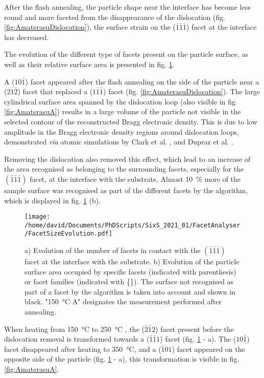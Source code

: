 After the flash annealing, the particle shape near the interface has become less round and more faceted from the disappearance of the dislocation (fig. \ref{fig:AmaterasuDislocation}), the surface strain on the ($\bar{1}\bar{1}\bar{1}$) facet at the interface has decreased.

The evolution of the different type of facets present on the particle surface, as well as their relative surface area is presented in fig. \ref{fig:AmaterasuFacetsEvolution}.

A ($10\bar{1}$) facet appeared after the flash annealing on the side of the particle near a (2$\bar{1}\bar{2}$) facet that replaced a ($1\bar{1}\bar{1}$) facet (fig. \ref{fig:AmaterasuDislocation}).
The large cylindrical surface area spanned by the dislocation loop (also visible in fig. \ref{fig:AmaterasuA}) results in a large volume of the particle not visible in the selected contour of the reconstructed Bragg electronic density.
This is due to low amplitude in the Bragg electronic density regions around dislocation loops, demonstrated \textit{via} atomic simulations by Clark et al. \parencite*{Clark2015}, and Dupraz et al. \parencite*{Dupraz2017}.

Removing the dislocation also removed this effect, which lead to an increase of the area recognised as belonging to the surrounding facets, especially for the $(\bar{1}\bar{1}\bar{1})$ facet, at the interface with the substrate.
Almost \qty{10}{\percent} more of the sample surface was recognised as part of the different facets by the algorithm, which is displayed in fig. \ref{fig:AmaterasuFacetsEvolution} (b).

\begin{figure}[!htb]
    \centering
    \texttt{[image: /home/david/Documents/PhDScripts/SixS\_2021\_01/FacetAnalyser/FacetSizeEvolution.pdf]}
    \caption{
        a) Evolution of the number of facets in contact with the $(\bar{1}\bar{1}\bar{1})$ facet at the interface with the substrate.
        b) Evolution of the particle surface area occupied by specific facets (indicated with parenthesis) or facet families (indicated with \{\}).
        The surface not recognised as part of a facet by the algorithm is taken into account and shown in black.
        "\qty{150}{\degreeCelsius} A" designates the measurement performed after annealing.
    }
    \label{fig:AmaterasuFacetsEvolution}
\end{figure}

When heating from \qty{150}{\degreeCelsius} to \qty{250}{\degreeCelsius} , the ($\bar{2}\bar{1}2$) facet present before the dislocation removal is transformed towards a ($\bar{1}\bar{1}1$) facet (fig. \ref{fig:AmaterasuFacetsEvolution} - a).
The ($10\bar{1}$) facet disappeared after heating to \qty{350}{\degreeCelsius}, and a ($\bar{1}01$) facet appeared on the opposite side of the particle (fig. \ref{fig:AmaterasuFacetsEvolution} - a), this transformation is visible in fig. \ref{fig:AmaterasuA}.

